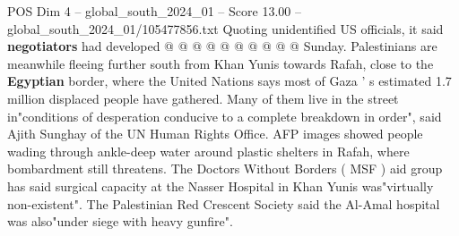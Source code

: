 \begin{textsample}{POS Dim 4 – global\_south\_2024\_01 – Score 13.00 – global\_south\_2024\_01/105477856.txt}
Quoting unidentified US officials, it said \textbf{negotiators} had developed @ @ @ @ @ @ @ @ @ @ Sunday.
Palestinians are meanwhile fleeing further south from Khan Yunis towards Rafah, close to the \textbf{Egyptian} border, where the United Nations says most of Gaza ' s estimated 1.7 million displaced people have gathered.
Many of them live in the street in"conditions of desperation conducive to a complete breakdown in order", said Ajith Sunghay of the UN Human Rights Office.
AFP images showed people wading through ankle-deep water around plastic shelters in Rafah, where bombardment still threatens.
The Doctors Without Borders ( MSF ) aid group has said surgical capacity at the Nasser Hospital in Khan Yunis was"virtually non-existent".
The Palestinian Red Crescent Society said the Al-Amal hospital was also"under siege with heavy gunfire".

\end{textsample}
